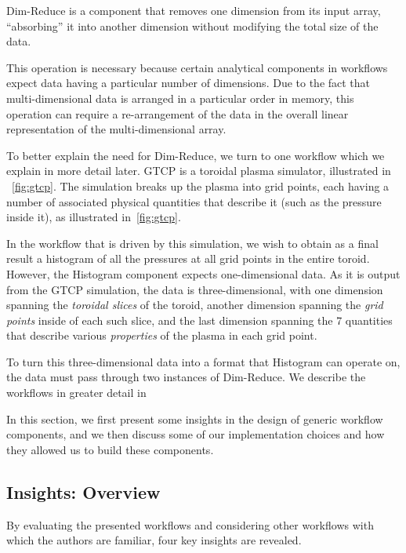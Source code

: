 Dim-Reduce is a component that removes one dimension from its
input array, ``absorbing'' it into another dimension without
modifying the total size of the data.

This operation is necessary because certain analytical
components in workflows expect data having a particular number
of dimensions.
Due to the fact that  multi-dimensional data is arranged
in a particular order in memory, this operation
can require a re-arrangement
of the data in the overall linear representation
of the multi-dimensional array.

To better explain the need for Dim-Reduce, we turn to one
workflow which we explain in more detail later.
GTCP is a toroidal plasma simulator, illustrated in
~\autoref{fig:gtcp}.
The simulation breaks up the plasma into grid points,
each having a number of associated physical quantities
that describe it (such as the pressure inside it), as illustrated
in~\autoref{fig:gtcp}.

In the workflow that is driven
by this simulation, we wish to obtain
as a final result a histogram of
all the pressures at all grid points
in the entire toroid.
However, the Histogram component expects
one-dimensional data. As it is output
from the GTCP simulation, the data is
three-dimensional, with one dimension
spanning the \textit{toroidal slices}
of the toroid, another dimension
spanning the \textit{grid points} inside of each such
slice, and the last dimension spanning the
7 quantities that describe
various \textit{properties} of the plasma
in each grid point.

To turn this three-dimensional data
into a format that Histogram can operate
on, the data must pass through two instances
of Dim-Reduce. We describe the workflows
in greater detail in 





In this section, we first present
some insights in the design of
generic workflow components,
and we then discuss
some of our implementation choices
and how they allowed us to 
build these components.

\subsection{Insights: Overview}

By evaluating the presented workflows
and considering other workflows with
which the authors are familiar,
four key insights are revealed.

